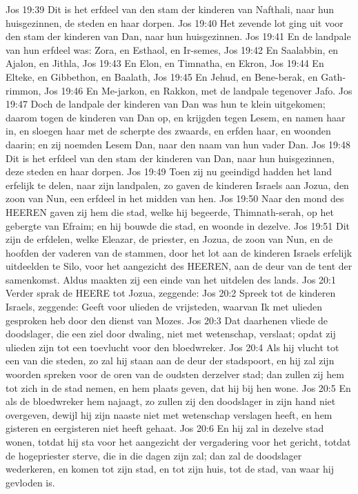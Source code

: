 Jos 19:39  Dit is het erfdeel van den stam der kinderen van Nafthali, naar hun huisgezinnen, de steden en haar dorpen.
Jos 19:40  Het zevende lot ging uit voor den stam der kinderen van Dan, naar hun huisgezinnen.
Jos 19:41  En de landpale van hun erfdeel was: Zora, en Esthaol, en Ir-semes,
Jos 19:42  En Saalabbin, en Ajalon, en Jithla,
Jos 19:43  En Elon, en Timnatha, en Ekron,
Jos 19:44  En Elteke, en Gibbethon, en Baalath,
Jos 19:45  En Jehud, en Bene-berak, en Gath-rimmon,
Jos 19:46  En Me-jarkon, en Rakkon, met de landpale tegenover Jafo.
Jos 19:47  Doch de landpale der kinderen van Dan was hun te klein uitgekomen; daarom togen de kinderen van Dan op, en krijgden tegen Lesem, en namen haar in, en sloegen haar met de scherpte des zwaards, en erfden haar, en woonden daarin; en zij noemden Lesem Dan, naar den naam van hun vader Dan.
Jos 19:48  Dit is het erfdeel van den stam der kinderen van Dan, naar hun huisgezinnen, deze steden en haar dorpen.
Jos 19:49  Toen zij nu geeindigd hadden het land erfelijk te delen, naar zijn landpalen, zo gaven de kinderen Israels aan Jozua, den zoon van Nun, een erfdeel in het midden van hen.
Jos 19:50  Naar den mond des HEEREN gaven zij hem die stad, welke hij begeerde, Thimnath-serah, op het gebergte van Efraim; en hij bouwde die stad, en woonde in dezelve.
Jos 19:51  Dit zijn de erfdelen, welke Eleazar, de priester, en Jozua, de zoon van Nun, en de hoofden der vaderen van de stammen, door het lot aan de kinderen Israels erfelijk uitdeelden te Silo, voor het aangezicht des HEEREN, aan de deur van de tent der samenkomst. Aldus maakten zij een einde van het uitdelen des lands.
Jos 20:1  Verder sprak de HEERE tot Jozua, zeggende:
Jos 20:2  Spreek tot de kinderen Israels, zeggende: Geeft voor ulieden de vrijsteden, waarvan Ik met ulieden gesproken heb door den dienst van Mozes.
Jos 20:3  Dat daarhenen vliede de doodslager, die een ziel door dwaling, niet met wetenschap, verslaat; opdat zij ulieden zijn tot een toevlucht voor den bloedwreker.
Jos 20:4  Als hij vlucht tot een van die steden, zo zal hij staan aan de deur der stadspoort, en hij zal zijn woorden spreken voor de oren van de oudsten derzelver stad; dan zullen zij hem tot zich in de stad nemen, en hem plaats geven, dat hij bij hen wone.
Jos 20:5  En als de bloedwreker hem najaagt, zo zullen zij den doodslager in zijn hand niet overgeven, dewijl hij zijn naaste niet met wetenschap verslagen heeft, en hem gisteren en eergisteren niet heeft gehaat.
Jos 20:6  En hij zal in dezelve stad wonen, totdat hij sta voor het aangezicht der vergadering voor het gericht, totdat de hogepriester sterve, die in die dagen zijn zal; dan zal de doodslager wederkeren, en komen tot zijn stad, en tot zijn huis, tot de stad, van waar hij gevloden is.
